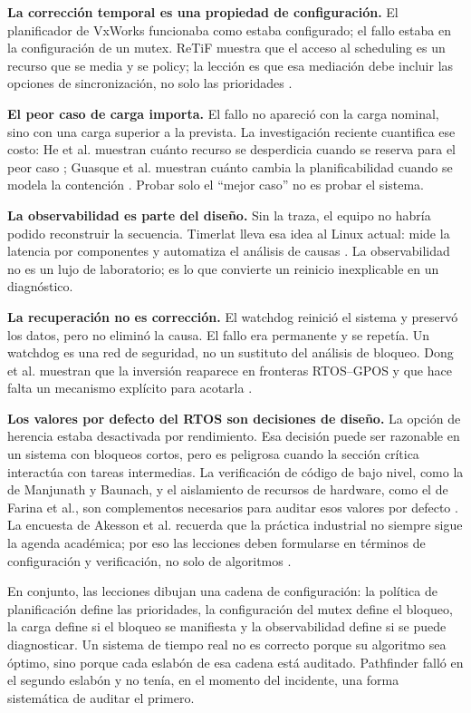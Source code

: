 \documentclass[journal]{IEEEtran}
\begin{document}
\textbf{La corrección temporal es una propiedad de configuración.} El planificador de VxWorks funcionaba como estaba configurado; el fallo estaba en la configuración de un mutex. ReTiF muestra que el acceso al scheduling es un recurso que se media y se policy; la lección es que esa mediación debe incluir las opciones de sincronización, no solo las prioridades \cite{serra2021retif}.

\textbf{El peor caso de carga importa.} El fallo no apareció con la carga nominal, sino con una carga superior a la prevista. La investigación reciente cuantifica ese costo: He et al. muestran cuánto recurso se desperdicia cuando se reserva para el peor caso \cite{he2024resource}; Guasque et al. muestran cuánto cambia la planificabilidad cuando se modela la contención \cite{guasque2022schedulability}. Probar solo el ``mejor caso'' no es probar el sistema.

\textbf{La observabilidad es parte del diseño.} Sin la traza, el equipo no habría podido reconstruir la secuencia. Timerlat lleva esa idea al Linux actual: mide la latencia por componentes y automatiza el análisis de causas \cite{deoliveira2025timerlat}. La observabilidad no es un lujo de laboratorio; es lo que convierte un reinicio inexplicable en un diagnóstico.

\textbf{La recuperación no es corrección.} El watchdog reinició el sistema y preservó los datos, pero no eliminó la causa. El fallo era permanente y se repetía. Un watchdog es una red de seguridad, no un sustituto del análisis de bloqueo. Dong et al. muestran que la inversión reaparece en fronteras RTOS--GPOS y que hace falta un mecanismo explícito para acotarla \cite{dong2020build}.

\textbf{Los valores por defecto del RTOS son decisiones de diseño.} La opción de herencia estaba desactivada por rendimiento. Esa decisión puede ser razonable en un sistema con bloqueos cortos, pero es peligrosa cuando la sección crítica interactúa con tareas intermedias. La verificación de código de bajo nivel, como la de Manjunath y Baunach, y el aislamiento de recursos de hardware, como el de Farina et al., son complementos necesarios para auditar esos valores por defecto \cite{manjunath2024framework,farina2023enabling}. La encuesta de Akesson et al. recuerda que la práctica industrial no siempre sigue la agenda académica; por eso las lecciones deben formularse en términos de configuración y verificación, no solo de algoritmos \cite{akesson2022survey}.

En conjunto, las lecciones dibujan una cadena de configuración: la política de planificación define las prioridades, la configuración del mutex define el bloqueo, la carga define si el bloqueo se manifiesta y la observabilidad define si se puede diagnosticar. Un sistema de tiempo real no es correcto porque su algoritmo sea óptimo, sino porque cada eslabón de esa cadena está auditado. Pathfinder falló en el segundo eslabón y no tenía, en el momento del incidente, una forma sistemática de auditar el primero.
\end{document}

